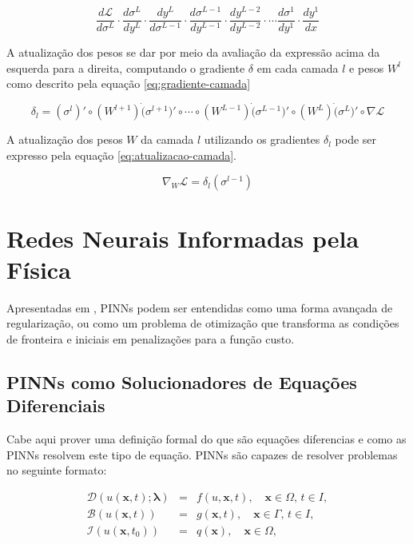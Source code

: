 \begin{equation}\label{eq:derivida-loss}
    \frac{d\mathcal{L}}{d\sigma^{L}} \cdot 
    \frac{d\sigma^{L}}{dy^{L}} \cdot
    \frac{dy^{L}}{d\sigma^{L-1}} \cdot
    \frac{d\sigma^{L-1}}{dy^{L-1}} \cdot
    \frac{dy^{L-2}}{dy^{L-2}} \cdot
    \cdots
    \frac{d\sigma^{1}}{dy^{1}} \cdot
    \frac{dy^{1}}{dx}
\end{equation}

A atualização dos pesos se dar por meio da avaliação da expressão acima da esquerda 
para a direita, computando o gradiente $\delta$ em cada camada $l$ e pesos $W^l$
como descrito pela equação
\ref{eq:gradiente-camada}

\begin{equation}\label{eq:gradiente-camada}
    \delta_{l} = (\sigma^l)' \circ (W^{l+1}) \dot (\sigma^{l + 1})' \circ 
    \cdots 
    \circ (W^{L-1}) \dot (\sigma^{L-1})' 
    \circ (W^{L}) \dot (\sigma^{L})'
    \circ \nabla \mathcal{L}
\end{equation}

A atualização dos pesos $W$ da camada $l$ utilizando os gradientes $\delta_l$ 
pode ser expresso pela equação \ref{eq:atualizacao-camada}.

\begin{equation}\label{eq:atualizacao-camada}
    \nabla_W \mathcal{L} = \delta_l (\sigma^{l-1}) 
\end{equation}

\section{Redes Neurais Informadas pela Física}

Apresentadas em \cite{raissi-etal:19}, PINNs podem ser entendidas como uma forma
avançada de regularização, ou como um problema de otimização que transforma 
as condições de fronteira e iniciais em penalizações para a função custo. 

\subsection{PINNs como Solucionadores de Equações Diferenciais}

Cabe aqui prover uma definição formal do que são equações diferencias e como as 
PINNs resolvem este tipo de equação. 
PINNs são capazes de resolver problemas no seguinte formato: 

\begin{eqnarray}
    \mathcal{D}(u(\boldsymbol{x},t);\boldsymbol{\lambda}) &=& f(u,\boldsymbol{x},t), \quad \boldsymbol{x} \in \Omega, \, t \in I, \label{model-1-a}\\
    \mathcal{B}(u(\boldsymbol{x},t)) &=& g(\boldsymbol{x},t), \quad \boldsymbol{x} \in \Gamma, \, t \in I, \label{model-1-b}\\
    \mathcal{I}(u(\boldsymbol{x},t_0)) &=& q(\boldsymbol{x}), \quad \boldsymbol{x} \in \Omega, \label{model-1-c}
\end{eqnarray}

